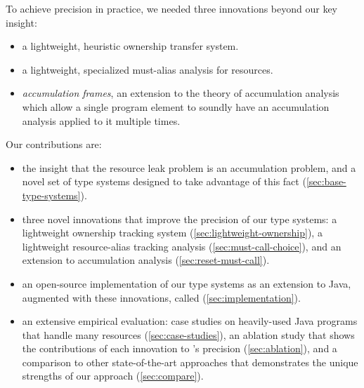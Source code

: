 To achieve precision in practice, we needed three
innovations beyond our key insight:
\begin{itemize}
\item a lightweight, heuristic ownership transfer system.
\item a lightweight, specialized must-alias analysis for resources.
\item \emph{accumulation frames}, an extension to the theory of
  accumulation analysis which allow a single program element to
  soundly have an accumulation analysis applied to it multiple times.
\end{itemize}

Our contributions are:
\begin{itemize}
\item the insight that the resource leak problem is an accumulation
  problem, and a novel set of type systems designed to take advantage
  of this fact (\cref{sec:base-type-systems}).
\item three novel innovations that improve the precision of our type
  systems: a lightweight ownership tracking system
  (\cref{sec:lightweight-ownership}), a lightweight resource-alias
  tracking analysis (\cref{sec:must-call-choice}), and an extension to
  accumulation analysis (\cref{sec:reset-must-call}).
\item an open-source implementation of our type systems as an extension to Java,
  augmented with these innovations, called \tool (\cref{sec:implementation}).
\item an extensive empirical evaluation: case studies on heavily-used
  Java programs that handle many resources (\cref{sec:case-studies}),
  an ablation study that shows the contributions of each innovation to
  \tool's precision (\cref{sec:ablation}), and a comparison to
  other state-of-the-art approaches that demonstrates the unique strengths
  of our approach (\cref{sec:compare}).
\end{itemize}
  

